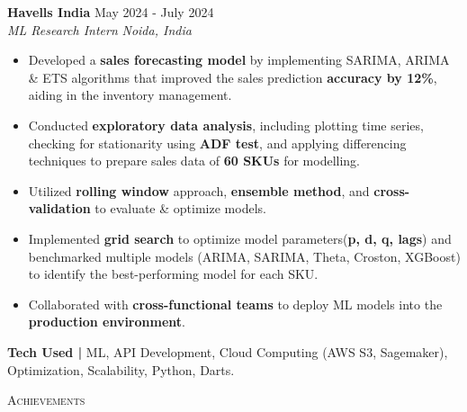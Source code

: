 \documentclass[letterpaper, 10.5t]{article}
\newcommand{\tinyBulletSep} { \vspace{1.2mm} }
\newcommand{\sectionSep} { \vspace{2.5mm} }
\newcommand{\lineunder} {
    \vspace*{-8pt} \\
    \hspace*{-15pt} \hrulefill \\
}
\newcommand{\header} [1] {
    {\hspace*{-18pt}\vspace*{6pt} {
        \fontfamily{qcs}\selectfont \large \scshape #1
    }}
    \vspace*{-6pt} \lineunder
    \vspace{1.1mm}
}
\newcommand{\experienceItem}[5]{
    \textbf{#1} \hfill #2 \\
    \textit{#3} \hfill \textit{#4} \\
    #5
}
\newcommand{\link}[2]{
    {\fontfamily{lmtt}\selectfont\href{#1}{#2}}
}
\begin{document}
\experienceItem{Havells India}{May 2024 - July 2024}{ML Research Intern}{Noida, India}{
\begin{itemize}
    \vspace{0.7mm}
    \item Developed a \textbf{sales forecasting model} by implementing SARIMA, ARIMA \& ETS algorithms that improved the sales prediction \textbf{accuracy by 12\%}, aiding in the inventory management. 
    \vspace{0.7mm}
    
    \item Conducted \textbf{exploratory data analysis}, including plotting time series, checking for stationarity using \textbf{ADF test}, and applying differencing techniques to prepare sales data of \textbf{60 SKUs} for modelling. 
    \vspace{0.7mm}

    \item Utilized \textbf{rolling window} approach, \textbf{ensemble method}, and \textbf{cross-validation} to evaluate \& optimize models.
    \vspace{0.7mm}

    \item Implemented \textbf{grid search} to optimize model parameters(\textbf{p, d, q, lags}) and benchmarked multiple models (ARIMA, SARIMA, Theta, Croston, XGBoost) to identify the best-performing model for each SKU.
    \vspace{0.7mm}

    \item Collaborated with \textbf{cross-functional teams} to deploy ML models into the \textbf{production environment}.
    \tinyBulletSep
    

\end{itemize}
\textbf{Tech Used |} ML, API Development, Cloud Computing (AWS S3, Sagemaker), Optimization, Scalability, Python, Darts.
}

\sectionSep


\header{Achievements}


\end{document}

